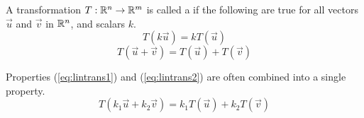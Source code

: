 \documentclass{ximera}
\begin{document}
  \begin{definition} \label{def:lin}
 A transformation $T:\mathbb{R}^n\rightarrow \mathbb{R}^m$ is called a  if the following are true for all vectors $\vec{u}$ and $\vec{v}$ in $\mathbb{R}^n$, and scalars $k$.
\begin{equation}\label{eq:lintrans1}
T(k\vec{u})= kT(\vec{u})
\end{equation}
\begin{equation}\label{eq:lintrans2}
T(\vec{u}+\vec{v})= T(\vec{u})+T(\vec{v})
\end{equation}
\end{definition}

\begin{remark}
Properties (\ref{eq:lintrans1}) and (\ref{eq:lintrans2}) are often combined into a single property.
\begin{equation*}
T(k_1\vec{u}+k_2\vec{v})= k_1T(\vec{u})+k_2T(\vec{v})
\end{equation*}
\end{remark}
\end{document}
